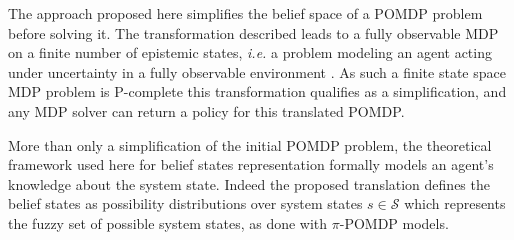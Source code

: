 The approach proposed here simplifies the belief space of a POMDP problem before solving it.
The transformation described leads to a fully observable MDP on a finite
number of epistemic states, \textit{i.e.} a problem 
modeling an agent acting under uncertainty in a fully
observable environment \cite{Puterman-MDP}. As such a finite state space 
MDP problem is P-complete \cite{Papadimitriou:1987:CMD:35577.35581} 
this transformation qualifies as a simplification, and any MDP solver 
can return a policy for this translated POMDP.



More than only a simplification of the initial POMDP problem,
the theoretical framework used here for belief states representation
formally models an agent's knowledge about the system state.
Indeed the proposed translation defines the belief states as possibility distributions
over system states $s \in \mathcal{S}$
which represents the fuzzy set of possible system states, 
as done with $\pi$-POMDP models.



